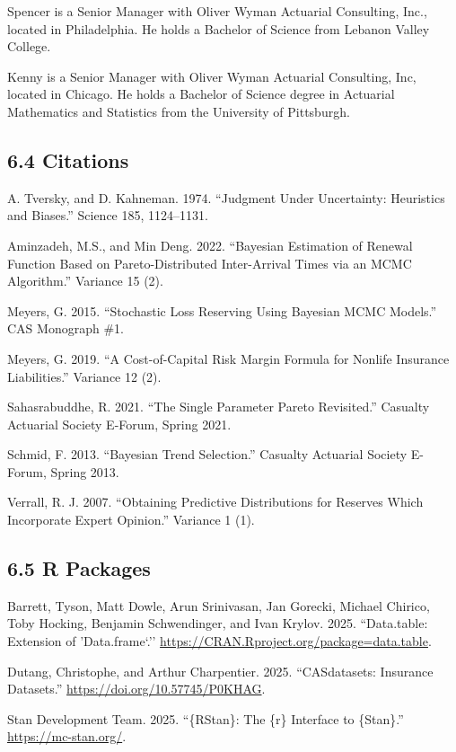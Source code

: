 \documentclass[
]{article}
\begin{document}
Spencer is a Senior Manager with Oliver Wyman Actuarial Consulting,
Inc., located in Philadelphia. He holds a Bachelor of Science from
Lebanon Valley College.

Kenny is a Senior Manager with Oliver Wyman Actuarial Consulting, Inc,
located in Chicago. He holds a Bachelor of Science degree in Actuarial
Mathematics and Statistics from the University of Pittsburgh.

\hypertarget{citations}{%
\subsection{6.4 Citations}\label{citations}}

A. Tversky, and D. Kahneman. 1974. ``Judgment Under Uncertainty:
Heuristics and Biases.'' Science 185, 1124--1131.

Aminzadeh, M.S., and Min Deng. 2022. ``Bayesian Estimation of Renewal
Function Based on Pareto-Distributed Inter-Arrival Times via an MCMC
Algorithm.'' Variance 15 (2).

Meyers, G. 2015. ``Stochastic Loss Reserving Using Bayesian MCMC
Models.'' CAS Monograph \#1.

Meyers, G. 2019. ``A Cost-of-Capital Risk Margin Formula for Nonlife
Insurance Liabilities.'' Variance 12 (2).

Sahasrabuddhe, R. 2021. ``The Single Parameter Pareto Revisited.''
Casualty Actuarial Society E-Forum, Spring 2021.

Schmid, F. 2013. ``Bayesian Trend Selection.'' Casualty Actuarial
Society E-Forum, Spring 2013.

Verrall, R. J. 2007. ``Obtaining Predictive Distributions for Reserves
Which Incorporate Expert Opinion.'' Variance 1 (1).

\hypertarget{r-packages}{%
\subsection{6.5 R Packages}\label{r-packages}}

Barrett, Tyson, Matt Dowle, Arun Srinivasan, Jan Gorecki, Michael
Chirico, Toby Hocking, Benjamin Schwendinger, and Ivan Krylov. 2025.
``Data.table: Extension of 'Data.frame`.''
\url{https://CRAN.Rproject.org/package=data.table}.

Dutang, Christophe, and Arthur Charpentier. 2025. ``CASdatasets:
Insurance Datasets.'' \url{https://doi.org/10.57745/P0KHAG}.

Stan Development Team. 2025. ``\{RStan\}: The \{r\} Interface to
\{Stan\}.'' \url{https://mc-stan.org/}.
\end{document}
